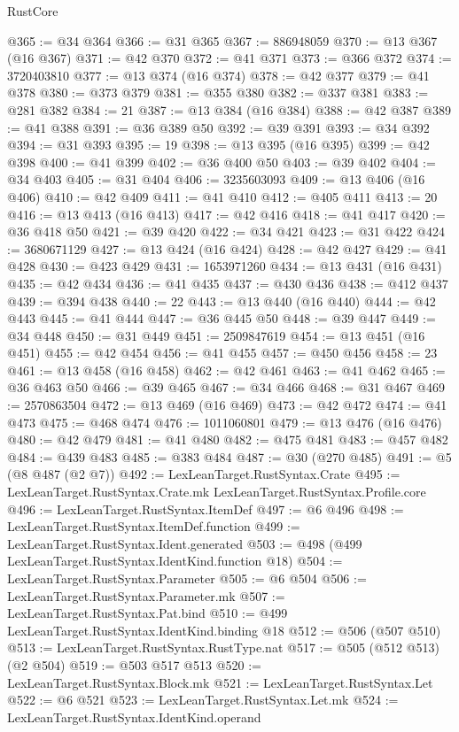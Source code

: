 \begin{lexlean}{RustCore}
\begin{coremodule}
@365 := @34 @364
@366 := @31 @365
@367 := 886948059
@370 := @13 @367 (@16 @367)
@371 := @42 @370
@372 := @41 @371
@373 := @366 @372
@374 := 3720403810
@377 := @13 @374 (@16 @374)
@378 := @42 @377
@379 := @41 @378
@380 := @373 @379
@381 := @355 @380
@382 := @337 @381
@383 := @281 @382
@384 := 21
@387 := @13 @384 (@16 @384)
@388 := @42 @387
@389 := @41 @388
@391 := @36 @389 @50
@392 := @39 @391
@393 := @34 @392
@394 := @31 @393
@395 := 19
@398 := @13 @395 (@16 @395)
@399 := @42 @398
@400 := @41 @399
@402 := @36 @400 @50
@403 := @39 @402
@404 := @34 @403
@405 := @31 @404
@406 := 3235603093
@409 := @13 @406 (@16 @406)
@410 := @42 @409
@411 := @41 @410
@412 := @405 @411
@413 := 20
@416 := @13 @413 (@16 @413)
@417 := @42 @416
@418 := @41 @417
@420 := @36 @418 @50
@421 := @39 @420
@422 := @34 @421
@423 := @31 @422
@424 := 3680671129
@427 := @13 @424 (@16 @424)
@428 := @42 @427
@429 := @41 @428
@430 := @423 @429
@431 := 1653971260
@434 := @13 @431 (@16 @431)
@435 := @42 @434
@436 := @41 @435
@437 := @430 @436
@438 := @412 @437
@439 := @394 @438
@440 := 22
@443 := @13 @440 (@16 @440)
@444 := @42 @443
@445 := @41 @444
@447 := @36 @445 @50
@448 := @39 @447
@449 := @34 @448
@450 := @31 @449
@451 := 2509847619
@454 := @13 @451 (@16 @451)
@455 := @42 @454
@456 := @41 @455
@457 := @450 @456
@458 := 23
@461 := @13 @458 (@16 @458)
@462 := @42 @461
@463 := @41 @462
@465 := @36 @463 @50
@466 := @39 @465
@467 := @34 @466
@468 := @31 @467
@469 := 2570863504
@472 := @13 @469 (@16 @469)
@473 := @42 @472
@474 := @41 @473
@475 := @468 @474
@476 := 1011060801
@479 := @13 @476 (@16 @476)
@480 := @42 @479
@481 := @41 @480
@482 := @475 @481
@483 := @457 @482
@484 := @439 @483
@485 := @383 @484
@487 := @30 (@270 @485)
@491 := @5 (@8 @487 (@2 @7))
@492 := LexLeanTarget.RustSyntax.Crate
@495 := LexLeanTarget.RustSyntax.Crate.mk LexLeanTarget.RustSyntax.Profile.core
@496 := LexLeanTarget.RustSyntax.ItemDef
@497 := @6 @496
@498 := LexLeanTarget.RustSyntax.ItemDef.function
@499 := LexLeanTarget.RustSyntax.Ident.generated
@503 := @498 (@499 LexLeanTarget.RustSyntax.IdentKind.function @18)
@504 := LexLeanTarget.RustSyntax.Parameter
@505 := @6 @504
@506 := LexLeanTarget.RustSyntax.Parameter.mk
@507 := LexLeanTarget.RustSyntax.Pat.bind
@510 := @499 LexLeanTarget.RustSyntax.IdentKind.binding @18
@512 := @506 (@507 @510)
@513 := LexLeanTarget.RustSyntax.RustType.nat
@517 := @505 (@512 @513) (@2 @504)
@519 := @503 @517 @513
@520 := LexLeanTarget.RustSyntax.Block.mk
@521 := LexLeanTarget.RustSyntax.Let
@522 := @6 @521
@523 := LexLeanTarget.RustSyntax.Let.mk
@524 := LexLeanTarget.RustSyntax.IdentKind.operand

\end{coremodule}
\end{lexlean}
